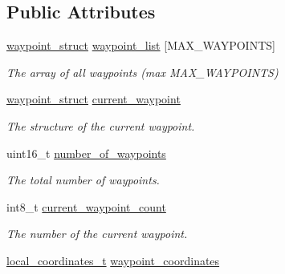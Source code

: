 \subsection*{Public Attributes}
\begin{DoxyCompactItemize}
\item 
\hypertarget{structmavlink__waypoint__handler__t_a045d655b0ec4a27ed7c5b17cbb07ff03}{\hyperlink{structwaypoint__struct}{waypoint\+\_\+struct} \hyperlink{structmavlink__waypoint__handler__t_a045d655b0ec4a27ed7c5b17cbb07ff03}{waypoint\+\_\+list} \mbox{[}M\+A\+X\+\_\+\+W\+A\+Y\+P\+O\+I\+N\+T\+S\mbox{]}}\label{structmavlink__waypoint__handler__t_a045d655b0ec4a27ed7c5b17cbb07ff03}

\begin{DoxyCompactList}\small\item\em The array of all waypoints (max M\+A\+X\+\_\+\+W\+A\+Y\+P\+O\+I\+N\+T\+S) \end{DoxyCompactList}\item 
\hypertarget{structmavlink__waypoint__handler__t_af04df874c5291a9956bf67e5c18c5b26}{\hyperlink{structwaypoint__struct}{waypoint\+\_\+struct} \hyperlink{structmavlink__waypoint__handler__t_af04df874c5291a9956bf67e5c18c5b26}{current\+\_\+waypoint}}\label{structmavlink__waypoint__handler__t_af04df874c5291a9956bf67e5c18c5b26}

\begin{DoxyCompactList}\small\item\em The structure of the current waypoint. \end{DoxyCompactList}\item 
\hypertarget{structmavlink__waypoint__handler__t_a699eaadceecc39cb66764948c59b6d0b}{uint16\+\_\+t \hyperlink{structmavlink__waypoint__handler__t_a699eaadceecc39cb66764948c59b6d0b}{number\+\_\+of\+\_\+waypoints}}\label{structmavlink__waypoint__handler__t_a699eaadceecc39cb66764948c59b6d0b}

\begin{DoxyCompactList}\small\item\em The total number of waypoints. \end{DoxyCompactList}\item 
\hypertarget{structmavlink__waypoint__handler__t_ac283fc2ef5799b017674795368a090af}{int8\+\_\+t \hyperlink{structmavlink__waypoint__handler__t_ac283fc2ef5799b017674795368a090af}{current\+\_\+waypoint\+\_\+count}}\label{structmavlink__waypoint__handler__t_ac283fc2ef5799b017674795368a090af}

\begin{DoxyCompactList}\small\item\em The number of the current waypoint. \end{DoxyCompactList}\item 
\hypertarget{structmavlink__waypoint__handler__t_a02ae7f9a7e57047b3e05f7f699a28628}{\hyperlink{structlocal__coordinates__t}{local\+\_\+coordinates\+\_\+t} \hyperlink{structmavlink__waypoint__handler__t_a02ae7f9a7e57047b3e05f7f699a28628}{waypoint\+\_\+coordinates}}\label{structmavlink__waypoint__handler__t_a02ae7f9a7e57047b3e05f7f699a28628}


\end{DoxyCompactItemize}
